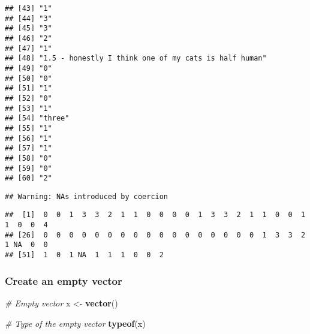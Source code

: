\documentclass[
]{article}
\newenvironment{Shaded}{\begin{snugshade}}{\end{snugshade}}
\newcommand{\CommentTok}[1]{\textcolor[rgb]{0.56,0.35,0.01}{\textit{#1}}}
\newcommand{\FunctionTok}[1]{\textcolor[rgb]{0.13,0.29,0.53}{\textbf{#1}}}
\newcommand{\NormalTok}[1]{#1}
\newcommand{\OtherTok}[1]{\textcolor[rgb]{0.56,0.35,0.01}{#1}}
\newcommand{\SpecialCharTok}[1]{\textcolor[rgb]{0.81,0.36,0.00}{\textbf{#1}}}
\begin{document}
\begin{verbatim}
## [43] "1"                                                  
## [44] "3"                                                  
## [45] "3"                                                  
## [46] "2"                                                  
## [47] "1"                                                  
## [48] "1.5 - honestly I think one of my cats is half human"
## [49] "0"                                                  
## [50] "0"                                                  
## [51] "1"                                                  
## [52] "0"                                                  
## [53] "1"                                                  
## [54] "three"                                              
## [55] "1"                                                  
## [56] "1"                                                  
## [57] "1"                                                  
## [58] "0"                                                  
## [59] "0"                                                  
## [60] "2"
\end{verbatim}

\begin{Shaded}
\end{Shaded}

\begin{verbatim}
## Warning: NAs introduced by coercion
\end{verbatim}

\begin{verbatim}
##  [1]  0  0  1  3  3  2  1  1  0  0  0  0  1  3  3  2  1  1  0  0  1  1  0  0  4
## [26]  0  0  0  0  0  0  0  0  0  0  0  0  0  0  0  0  0  1  3  3  2  1 NA  0  0
## [51]  1  0  1 NA  1  1  1  0  0  2
\end{verbatim}

\hypertarget{create-an-empty-vector}{%
\subsubsection{Create an empty vector}\label{create-an-empty-vector}}

\begin{Shaded}
\begin{Highlighting}[]
\CommentTok{\# Empty vector}
\NormalTok{x }\OtherTok{\textless{}{-}} \FunctionTok{vector}\NormalTok{()}

\CommentTok{\# Type of the empty vector}
\FunctionTok{typeof}\NormalTok{(x)}
\end{Highlighting}
\end{Shaded}
\end{document}
